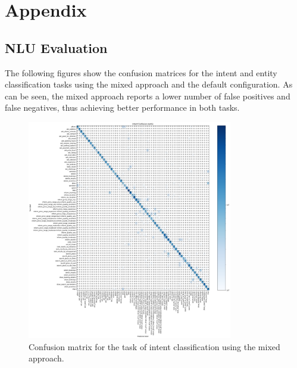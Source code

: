 \documentclass[twocolumn]{article}
\begin{document}
\newpage

\onecolumn
\appendix

\section{Appendix}

\subsection{NLU Evaluation}

The following figures show the confusion matrices for the intent and entity classification tasks using the mixed approach and the default configuration. As can be seen, the mixed approach reports a lower number of false positives and false negatives, thus achieving better performance in both tasks.

\begin{figure}[H]
    \centering
    \includegraphics[width=0.8\textwidth]{images/intent_mixed_cf.png}
    \caption{Confusion matrix for the task of intent classification using the mixed approach.}
    \label{fig:intent-mixed-cf}
\end{figure}
\end{document}
